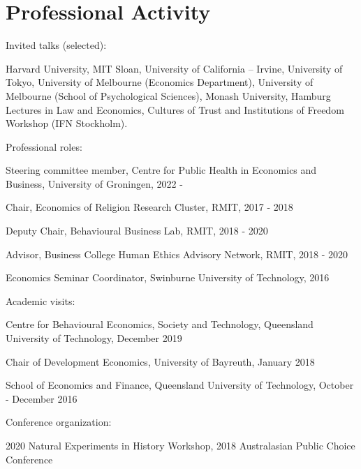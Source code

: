 \documentclass[letterpaper]{article}
\renewenvironment{itemize}{
  \begin{list}{}{
    \setlength{\leftmargin}{1.5em}
  }
}{
  \end{list}
}
\begin{document}
\section*{Professional Activity}

\begin{itemize}

\item Invited talks (selected):
\begin{itemize}
\item Harvard University, MIT Sloan, University of California -- Irvine, University of Tokyo, University of Melbourne (Economics Department), University of Melbourne (School of Psychological Sciences), Monash University, Hamburg Lectures in Law and Economics, Cultures of Trust and Institutions of Freedom Workshop (IFN Stockholm).
\end{itemize}

\item Professional roles:
\begin{itemize}
\item Steering committee member, Centre for Public Health in Economics and Business, University of Groningen, 2022 -
\item Chair, Economics of Religion Research Cluster, RMIT, 2017 - 2018
\item Deputy Chair, Behavioural Business Lab, RMIT, 2018 - 2020
\item Advisor, Business College Human Ethics Advisory Network, RMIT, 2018 - 2020
\item Economics Seminar Coordinator, Swinburne University of Technology, 2016
\end{itemize}

\item Academic visits:
\begin{itemize}
\item Centre for Behavioural Economics, Society and Technology, Queensland University of Technology, December 2019
\item Chair of Development Economics, University of Bayreuth, January 2018
\item School of Economics and Finance, Queensland University of Technology, October - December 2016
\end{itemize}

\item Conference organization:
\begin{itemize}
\item 2020 Natural Experiments in History Workshop, 2018 Australasian Public Choice Conference
\end{itemize}


\end{itemize}
\end{document}
